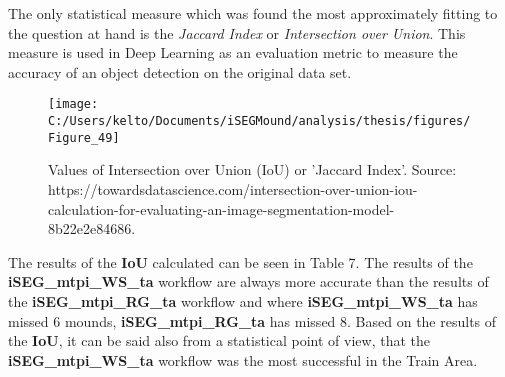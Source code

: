 \documentclass[
  12pt,
]{article}
\begin{document}
The only statistical measure which was found the most approximately fitting to the question at hand is the \emph{Jaccard Index} or \emph{Intersection over Union}. This measure is used in Deep Learning as an evaluation metric to measure the accuracy of an object detection on the original data set.

\begin{figure}

{\centering \texttt{[image: C:/Users/kelto/Documents/iSEGMound/analysis/thesis/figures/Figure\_49]} 

}

\caption{Values of Intersection over Union (IoU) or 'Jaccard Index'. Source: https://towardsdatascience.com/intersection-over-union-iou-calculation-for-evaluating-an-image-segmentation-model-8b22e2e84686.}\label{fig:Figure49}
\end{figure}

The results of the \textbf{IoU} calculated can be seen in Table 7. The results of the \textbf{iSEG\_mtpi\_WS\_ta} workflow are always more accurate than the results of the \textbf{iSEG\_mtpi\_RG\_ta} workflow and where \textbf{iSEG\_mtpi\_WS\_ta} has missed 6 mounds, \textbf{iSEG\_mtpi\_RG\_ta} has missed 8. Based on the results of the \textbf{IoU}, it can be said also from a statistical point of view, that the \textbf{iSEG\_mtpi\_WS\_ta} workflow was the most successful in the Train Area.
\end{document}
